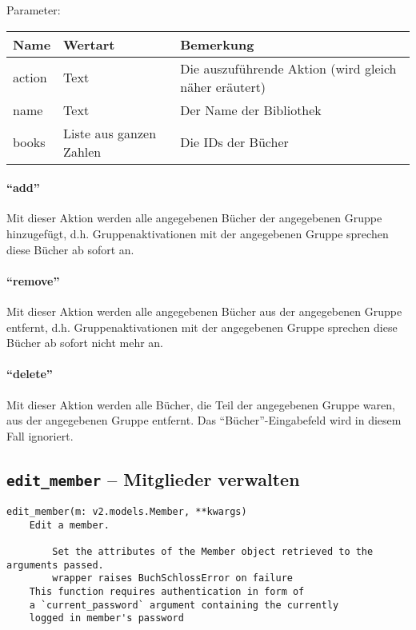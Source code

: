Parameter:

\begin{tabular}{|p{}|p{}|p{}|}
Name & Wertart & Bemerkung\\
\hline
action & Text & Die auszuführende Aktion (wird gleich näher eräutert) \\
name & Text & Der Name der Bibliothek \\
books & Liste aus ganzen Zahlen & Die IDs der Bücher
\end{tabular}

\paragraph{``add''}
Mit dieser Aktion werden alle angegebenen Bücher der angegebenen Gruppe hinzugefügt, d.h. Gruppenaktivationen mit der angegebenen Gruppe sprechen diese Bücher ab sofort an.

\paragraph{``remove''}
Mit dieser Aktion werden alle angegebenen Bücher aus der angegebenen Gruppe entfernt, d.h. Gruppenaktivationen mit der angegebenen Gruppe sprechen diese Bücher ab sofort nicht mehr an.

\paragraph{``delete''}
Mit dieser Aktion werden alle Bücher, die Teil der angegebenen Gruppe waren, aus der angegebenen Gruppe entfernt. Das ``Bücher''-Eingabefeld wird in diesem Fall ignoriert.


\subsection{\texttt{edit\_member} -- Mitglieder verwalten}
\label{subsec:command_list:edit_member}

\begin{verbatim}
edit_member(m: v2.models.Member, **kwargs)
    Edit a member.

        Set the attributes of the Member object retrieved to the arguments passed.
        wrapper raises BuchSchlossError on failure
    This function requires authentication in form of
    a `current_password` argument containing the currently
    logged in member's password
\end{verbatim}

